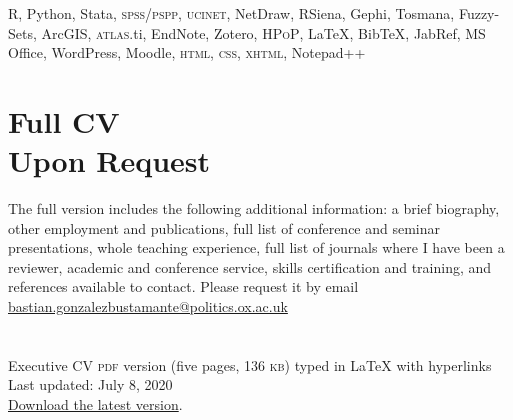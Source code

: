 \documentclass[letterpaper,margin]{res}
\begin{document}
\begin{resume}
{\small R, Python, Stata, {\scshape spss/pspp}, {\scshape ucinet}, NetDraw, RSiena, Gephi, Tosmana, Fuzzy-Sets, ArcGIS, {\scshape atlas}.ti, EndNote, Zotero, {\scshape HPoP}, {\LaTeX}, Bib{\TeX}, JabRef, MS Office, WordPress, Moodle, {\scshape html}, {\scshape css}, {\scshape xhtml}, Notepad{\footnotesize ++}}


\section{\footnotesize Full CV \\ Upon Request}

{\small The full version includes the following additional information: a brief biography, other employment and publications, full list of conference and seminar presentations, whole teaching experience, full list of journals where I have been a reviewer, academic and conference service, skills certification and training, and references available to contact. Please request it by email {\large \Letter} \href{mailto:bastian.gonzalezbustamante@politics.ox.ac.uk}{bastian.gonzalezbustamante@politics.ox.ac.uk}}\\

\section{}
{\footnotesize Executive CV {\scshape pdf} version (five pages, 136 {\scshape kb}) typed in {\small {\LaTeX}} with hyperlinks}\\
{\footnotesize Last updated: July 8, 2020}\\
{\footnotesize {\normalsize \faGithub} \href{https://bgonzalezbustamante.github.io/CV-LaTeX/}{Download the latest version}.}

\end{resume} 
\end{document}
